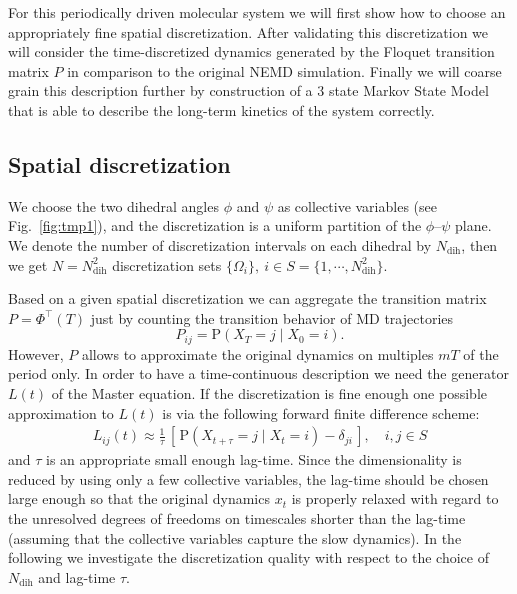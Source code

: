 \documentclass[journal=jctcce,manuscript=article]{achemso}
\newcommand{\vect}[1]{#1}
\newcommand{\myphi}{\Phi}
\newcommand{\prob}{\textrm{P}}
\newcommand{\dih}{\textrm{dih}}
\begin{document}
For this periodically driven molecular system we will first show how to choose an appropriately fine spatial discretization. After validating this discretization we will consider
the time-discretized dynamics generated by the Floquet transition matrix $\vect P$
in comparison to the original NEMD simulation. Finally we will coarse grain this description further by construction of a $3$ state Markov State Model that is able to describe the long-term kinetics of the system correctly. 

\subsection{Spatial discretization}

We choose the
two dihedral angles $\phi$ and $\psi$ as collective variables (see
Fig.~\ref{fig:tmp1}), and the discretization is a uniform partition of
the $\phi$--$\psi$ plane. We denote the number of discretization intervals on each
dihedral by $N_\dih$, then we get $N = N_\dih^2$ discretization sets 
$\{\Omega_i\},\ i\in S = \{1,\cdots,N_\dih^2\}$.

Based on a given spatial discretization we can aggregate the transition matrix $\vect P=\myphi^{\top}(T)$ just by counting the transition behavior of MD trajectories 
\begin{equation}\label{Pdirect}
\vect P_{ij}=\prob\left(\vect X_T=j\mid \vect X_0=i \right).
\end{equation}
However, $\vect P$ allows to approximate the original dynamics on multiples $mT$ of the period only. In order to have a time-continuous description we need the generator $L(t)$ of the Master equation. 
If the discretization is fine enough one possible approximation to $L(t)$ is via
the following forward finite difference scheme:
\begin{align}
  \label{eqn:tmp4}
  L_{ij}(t) \approx \frac{1}{\tau}
  \,[\, \prob (\vect X_{t+\tau} = j \mid \vect X_{t} = i) - \delta_{ji} \,],
  \quad i,j\in S
\end{align}
and $\tau$ is an appropriate small enough lag-time.
  Since the dimensionality is reduced by using only a few collective
  variables, the lag-time should be chosen large enough so that
  the original dynamics $x_t$ is properly relaxed with regard to
  the unresolved degrees of freedoms on timescales shorter than the lag-time
  (assuming  that the collective variables capture the slow dynamics).
  In the following 
we investigate the discretization
quality with respect to  the choice of $N_\dih$ and  lag-time $\tau$.
\end{document}
